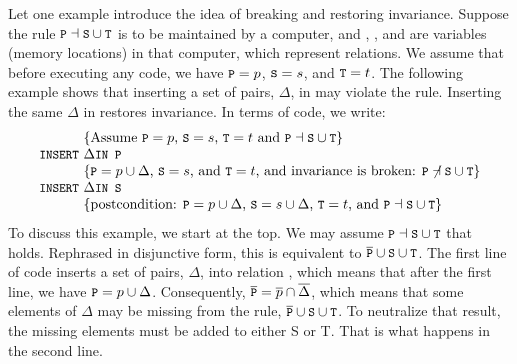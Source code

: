 \documentclass[11pt,a4paper,fleqn,oneside]{article}
\newcommand{\code}[1]{\text{\tt\small #1}}
\newcommand{\cmpl}[1]{\overline{#1}}
\newcommand{\subs}{\dashv}
\begin{document}
	Let one example introduce the idea of breaking and restoring invariance.
	Suppose the rule $\code{P}\subs\code{S}\cup\code{T}$ is to be maintained by a computer,
	and \code{P}, \code{S}, and \code{T} are variables (memory locations) in that computer,
	which represent relations.
	We assume that before executing any code, we have $\code{P}=p$, $\code{S}=s$, and $\code{T}=t$.
	The following example shows that inserting a set of pairs, $\Delta$, in \code{P}
	may violate the rule.
	Inserting the same $\Delta$ in \code{S} restores invariance.
	In terms of code, we write:
\[\begin{array}{r@{~}l}
&\{\text{Assume $\code{P}=p$, $\code{S}=s$, $\code{T}=t$ and $\code{P}\subs\code{S}\cup\code{T}$}\}\\
\code{INSERT}&\Delta\code{ IN P}\\
&\{\text{$\code{P}=p\cup\Delta$, $\code{S}=s$, and $\code{T}=t$, and invariance is broken: $\code{P}\not\subs\code{S}\cup\code{T}$}\}\\
\code{INSERT}&\Delta\code{ IN S}\\
&\{\text{postcondition: $\code{P}=p\cup\Delta$, $\code{S}=s\cup\Delta$, $\code{T}=t$, and $\code{P}\subs\code{S}\cup\code{T}$}\}\\
\end{array}\]
	To discuss this example, we start at the top.
	We may assume $\code{P}\subs\code{S}\cup\code{T}$ that holds.
	Rephrased in disjunctive form, this is equivalent to $\cmpl{\code{P}}\cup\code{S}\cup\code{T}$.
	The first line of code inserts a set of pairs, $\Delta$, into relation \code{P},
	which means that after the first line, we have $\code{P}=p\cup\Delta$.
	Consequently, $\cmpl{\code{P}}=\cmpl{p}\cap\cmpl{\Delta}$,
	which means that some elements of $\Delta$ may be missing from the rule, $\cmpl{\code{P}}\cup\code{S}\cup\code{T}$.
	To neutralize that result,
	the missing elements must be added to either S or T.
	That is what happens in the second line.
	
\end{document}
